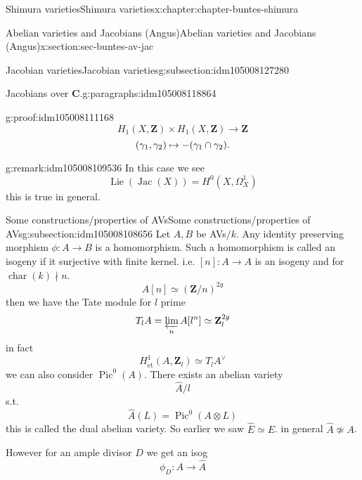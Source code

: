 \documentclass[oneside,10pt,]{book}
\newcommand{\qedhere}{\relax}
\numberwithin{equation}{section}
\DeclareMathOperator{\Lie}{Lie}
\newcommand{\lb}{[}
\newcommand{\rb}{]}
\newcommand{\ZZ}{\mathbf{Z}}
\newcommand{\CC}{\mathbf{C}}
\newcommand{\et}{\mathrm{\acute{e}t}}
\DeclareMathOperator{\Pic}{Pic}
\DeclareMathOperator{\Jac}{Jac}
\DeclareMathOperator{\characteristic}{char}
\begin{document}
\begin{chapterptx}{Shimura varieties}{}{Shimura varieties}{}{}{x:chapter:chapter-buntes-shimura}
\begin{sectionptx}{Abelian varieties and Jacobians (Angus)}{}{Abelian varieties and Jacobians (Angus)}{}{}{x:section:sec-buntes-av-jac}
\begin{subsectionptx}{Jacobian varieties}{}{Jacobian varieties}{}{}{g:subsection:idm105008127280}
\begin{paragraphs}{Jacobians over \(\CC\).}{g:paragraphs:idm105008118864}
\begin{proofptx}{}{g:proof:idm105008111168}
\begin{equation*}
H_1(X, \ZZ) \times H_1(X, \ZZ) \to \ZZ
\end{equation*}
%
\begin{equation*}
(\gamma_1, \gamma_2) \mapsto -(\gamma_1\cap \gamma_2)\text{.}\qedhere
\end{equation*}
%
\end{proofptx}
\begin{remark}{}{g:remark:idm105008109536}%
In this case we see%
\begin{equation*}
\Lie(\Jac(X)) = H^0(X, \Omega_X^1)
\end{equation*}
this is true in general.%
\end{remark}
\end{paragraphs}%
\end{subsectionptx}
%
%
\typeout{************************************************}
\typeout{************************************************}
%
\begin{subsectionptx}{Some constructions\slash{}properties of AVs}{}{Some constructions\slash{}properties of AVs}{}{}{g:subsection:idm105008108656}
Let \(A,B\) be AVs\(/k\). Any identity preserving morphism \(\phi \colon A \to B\) is a homomorphism. Such a homomorphism is called an isogeny if it surjective with finite kernel. i.e. \(\lb n \rb \colon A \to A\) is an isogeny and for \(\characteristic(k) \nmid n\).%
\begin{equation*}
A[n] \simeq (\ZZ/n)^{2g}
\end{equation*}
then we have the Tate module for \(l\) prime%
\begin{equation*}
T_lA = \varprojlim_n A[l^n] \simeq \ZZ_l^{2g}
\end{equation*}
in fact%
\begin{equation*}
H^1_{\et} (A, \ZZ_l) \simeq T_lA ^\vee
\end{equation*}
we can also consider \(\Pic^0(A)\). There exists an abelian variety%
\begin{equation*}
\hat A/l
\end{equation*}
s.t.%
\begin{equation*}
\hat A (L) = \Pic^0(A \otimes L)
\end{equation*}
this is called the dual abelian variety. So earlier we saw \(\hat E \simeq E\). in general \(\hat A \not \simeq  A\).%
\par
However for an ample divisor \(D\) we get an isog%
\begin{equation*}
\phi_D \colon A \to \hat A
\end{equation*}

\end{subsectionptx}
\end{sectionptx}
\end{chapterptx}
\end{document}

